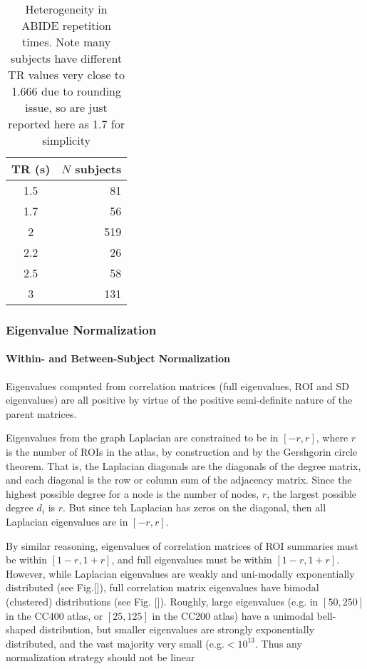 \documentclass[10pt]{article}
\begin{document}
\begin{table}
  \centering
  \begin{tabular}{cr}
  \toprule
  TR (s) &   \(N\) subjects \\
  \midrule
  1.5  &      81 \\
  1.7 &       56 \\
  2    &     519 \\
  2.2  &      26 \\
  2.5  &      58 \\
  3    &     131 \\
  \bottomrule
  \end{tabular}\label{tab:trs}
\caption{Heterogeneity in ABIDE repetition times. Note many subjects have different TR values very close to 1.666 due to rounding issue, so are just reported here as 1.7 for simplicity}
\end{table}

\subsubsection{Eigenvalue Normalization}

\paragraph{Within- and Between-Subject Normalization}

Eigenvalues computed from correlation matrices (full eigenvalues, ROI and SD eigenvalues)
are all positive by virtue of the positive semi-definite nature of the parent matrices.

Eigenvalues from the graph Laplacian are constrained to be in \([-r, r]\), where \(r\) is the number
of ROIs in the atlas, by construction and by the Gershgorin circle theorem. That is, the Laplacian
diagonals are the diagonals of the degree matrix, and each diagonal is the row or column sum of the
adjacency matrix. Since the highest possible degree for a node is the number of nodes, \(r\), the
largest possible degree \(d_i\) is \(r\). But since teh Laplacian has zeros on the diagonal, then
all Laplacian eigenvalues are in \([-r, r]\).

By similar reasoning, eigenvalues of correlation matrices of ROI summaries must be within \([1 - r,
1 + r]\), and full eigenvalues must be within \([1-r, 1+r]\). However, while Laplacian eigenvalues
are weakly and uni-modally exponentially distributed (see Fig.[]), full correlation matrix
eigenvalues have bimodal (clustered) distributions (see Fig. []).  Roughly, large eigenvalues (e.g.
in \([50, 250]\) in the CC400 atlas, or \([25, 125]\) in the CC200 atlas) have a unimodal
bell-shaped distribution, but smaller eigenvalues are strongly exponentially distributed, and the
vast majority very small (e.g.\(<10^{13}\). Thus any normalization strategy should not be linear
\end{document}
